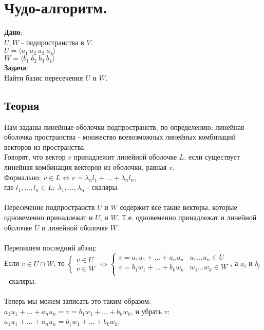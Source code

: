 \documentclass[a4paper,11pt]{report}
\title{}
\author{Пешехонов Иван. БПМИ1912}
\date{\today}
\begin{document}
\chapter{Чудо-алгоритм.}
\textbf{Дано}:\\
$U, W$ - подпространства в $V$.\\
$U = \langle a_1\ a_2\ a_3\ a_4 \rangle$\\
$W = \langle b_1\ b_2\ b_3\ b_4 \rangle$\\
\textbf{Задача}:\\
Найти базис пересечения $U$ и $W$.\\
\section{Теория}
Нам заданы линейные оболочки подпространств, по определению: линейная оболочка пространства - множество всевозможных линейных комбинаций векторов из пространства.\\
Говорят, что вектор $v$ принадлежит линейной оболочке $L$, если существует линейная комбинация векторов из оболочки, равная $v$.\\
Формально: $v \in L \Leftrightarrow v = \lambda_n{l_1} + ... + \lambda_n{l_n}$,\\ 
где $l_1, ..., l_n \in L;\ \lambda_1, ..., \lambda_n$ - скаляры.\\
\\
Пересечение подпространств $U$ и $W$ содержит все такие векторы, которые одновеменно принадлежат и $U$, и $W$.
Т.е. одновеменно принадлежат и линейной оболочке $U$ и линейной оболочке $W$.\\
\\
Перепишем последний абзац:\\
Если $v \in U \cap W$, то $
\begin{cases}
 v \in U\\
 v \in W
\end{cases}
\Leftrightarrow
\begin{cases}
 v = a_1u_1 + ... + a_nu_n & u_1...u_n \in U\\
 v = b_1w_1 + ... + b_kw_k & w_1...w_k \in W\\
\end{cases}
$, а $a_i$ и $b_i$ - скаляры.\\
\\
Теперь мы можем записать это таким образом:\\
$a_1u_1 + ... + a_nu_n = v = b_1w_1 + ... + b_kw_k$, и убрать $v$:\\
$a_1u_1 + ... + a_nu_n =  b_1w_1 + ... + b_kw_k$.\\
\end{document}
